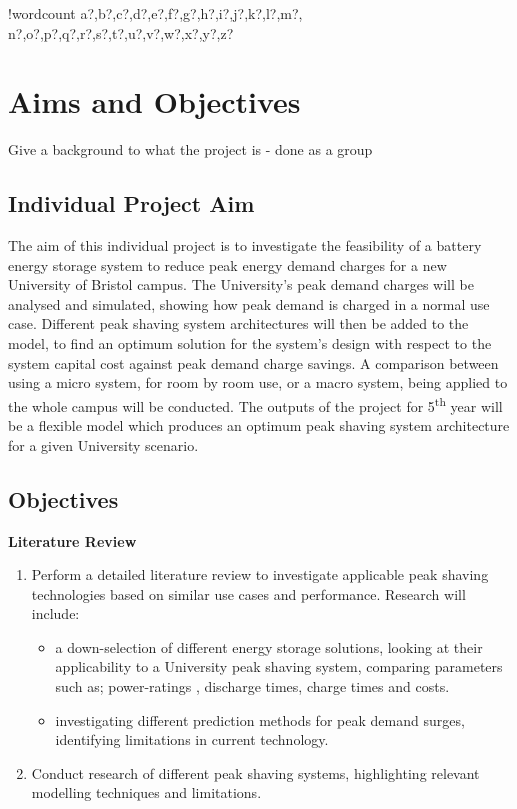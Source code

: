 \documentclass[10pt]{article}
\newcounter{words}
\newenvironment{counted}{%
  \setcounter{words}{0}
  \SearchList!{wordcount}{\stepcounter{words}}
    {a?,b?,c?,d?,e?,f?,g?,h?,i?,j?,k?,l?,m?,
    n?,o?,p?,q?,r?,s?,t?,u?,v?,w?,x?,y?,z?}
  \UndoBoundary{'}
  \SearchOrder{p;}}{%
  \StopSearching}
\begin{document}
\clearpage
{}
\begin{counted} %
\section{Aims and Objectives}\label{aims-and-objectives}

Give a background to what the project is - done as a group

\newpage

\subsection{Individual Project Aim}\label{individual-project-aim}

The aim of this individual project is to investigate the feasibility of
a battery energy storage system to reduce peak energy demand charges for
a new University of Bristol campus. The University's peak demand charges
will be analysed and simulated, showing how peak demand is charged in a
normal use case. Different peak shaving system architectures will then
be added to the model, to find an optimum solution for the system's
design with respect to the system capital cost against peak demand
charge savings. A comparison between using a micro system, for room by
room use, or a macro system, being applied to the whole campus will be
conducted. The outputs of the project for 5\textsuperscript{th} year
will be a flexible model which produces an optimum peak shaving system
architecture for a given University scenario.

\subsection{Objectives}\label{objectives}

\textbf{Literature Review}

\begin{enumerate}
\item Perform a detailed literature review to investigate applicable peak shaving technologies based on similar use cases and performance. Research will include:
    \begin{itemize}
 \item a down-selection of different energy storage solutions, looking at their applicability to a University peak shaving system, comparing parameters such as; power-ratings , discharge times, charge times and costs.
\item investigating different prediction methods for peak demand surges, identifying limitations in current technology.
    \end{itemize}
\item Conduct research of different peak shaving systems, highlighting relevant modelling techniques and limitations.
\end{enumerate}


\end{counted}
\end{document}
